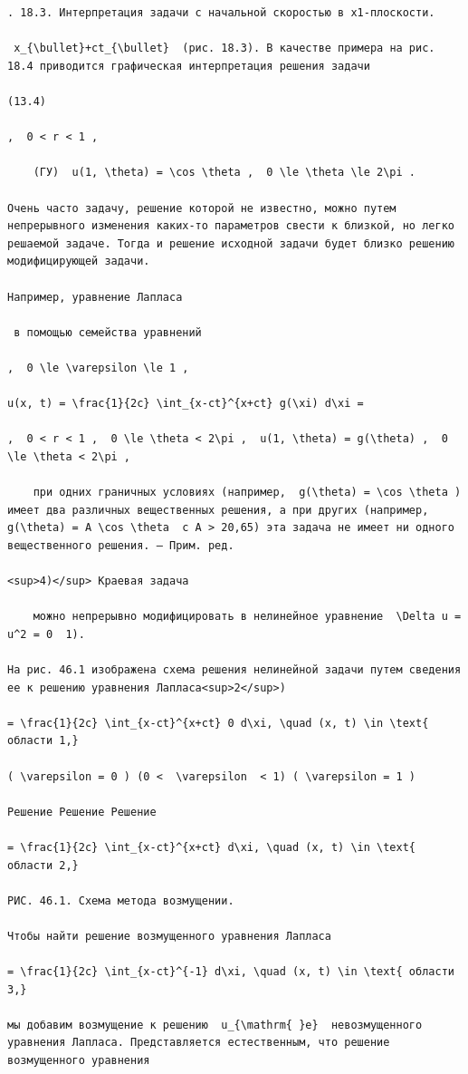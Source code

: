 \documentclass[
  ukrainian,
]{article}
\begin{document}
\begin{verbatim}
. 18.3. Интерпретация задачи с начальной скоростью в x1-плоскости.

 x_{\bullet}+ct_{\bullet}  (рис. 18.3). В качестве примера на рис. 18.4 приводится графическая интерпретация решения задачи

(13.4)

,  0 < r < 1 ,

    (ГУ)  u(1, \theta) = \cos \theta ,  0 \le \theta \le 2\pi .

Очень часто задачу, решение которой не известно, можно путем непрерывного изменения каких-то параметров свести к близкой, но легко решаемой задаче. Тогда и решение исходной задачи будет близко решению модифицирующей задачи.

Например, уравнение Лапласа

 в помощью семейства уравнений

,  0 \le \varepsilon \le 1 ,

u(x, t) = \frac{1}{2c} \int_{x-ct}^{x+ct} g(\xi) d\xi =

,  0 < r < 1 ,  0 \le \theta < 2\pi ,  u(1, \theta) = g(\theta) ,  0 \le \theta < 2\pi ,

    при одних граничных условиях (например,  g(\theta) = \cos \theta ) имеет два различных вещественных решения, а при других (например,  g(\theta) = A \cos \theta  с A > 20,65) эта задача не имеет ни одного вещественного решения. — Прим. ред.

<sup>4)</sup> Краевая задача

    можно непрерывно модифицировать в нелинейное уравнение  \Delta u = u^2 = 0  1).

На рис. 46.1 изображена схема решения нелинейной задачи путем сведения ее к решению уравнения Лапласа<sup>2</sup>)

= \frac{1}{2c} \int_{x-ct}^{x+ct} 0 d\xi, \quad (x, t) \in \text{ области 1,}

( \varepsilon = 0 ) (0 <  \varepsilon  < 1) ( \varepsilon = 1 )

Решение Решение Решение

= \frac{1}{2c} \int_{x-ct}^{x+ct} d\xi, \quad (x, t) \in \text{ области 2,}

РИС. 46.1. Схема метода возмущении.

Чтобы найти решение возмущенного уравнения Лапласа

= \frac{1}{2c} \int_{x-ct}^{-1} d\xi, \quad (x, t) \in \text{ области 3,}

мы добавим возмущение к решению  u_{\mathrm{ }e}  невозмущенного уравнения Лапласа. Представляется естественным, что решение возмущенного уравнения


\end{verbatim}
\end{document}
